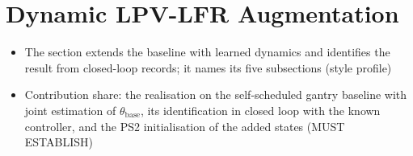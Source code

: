 %
\section{Dynamic LPV-LFR Augmentation}\label{sec:augmentation}
\ifdraft
\begin{itemize}
\item The section extends the baseline with learned dynamics and identifies the result from closed-loop records; it names its five subsections (style profile)
\item Contribution share: the realisation on the self-scheduled gantry baseline with joint estimation of $\theta_{\mathrm{base}}$, its identification in closed loop with the known controller, and the PS2 initialisation of the added states (MUST ESTABLISH)
\end{itemize}
\fi

